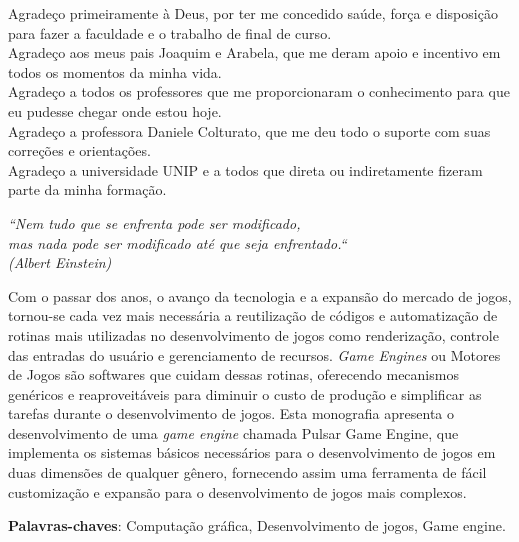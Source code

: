 \documentclass[12pt,	openright, twoside,	a4paper, english, french, spanish, brazil]{abntex2}
\begin{document}
\begin{agradecimentos}
Agradeço primeiramente à Deus, por ter me concedido saúde, força e disposição para fazer a faculdade e o trabalho de final de curso. \\

Agradeço aos meus pais Joaquim e Arabela, que me deram apoio e incentivo em todos os momentos da minha vida.\\

Agradeço a todos os professores que me proporcionaram o conhecimento para que eu pudesse chegar onde estou hoje. \\

Agradeço a professora Daniele Colturato, que me deu todo o suporte com suas correções e orientações. \\

Agradeço a universidade UNIP e a todos que direta ou indiretamente fizeram parte da minha formação.

\end{agradecimentos}

\begin{epigrafe}
    \vspace*{\fill}
	\begin{flushright}
		\textit{``Nem tudo que se enfrenta pode ser modificado, \\ 
		mas nada pode ser modificado até que seja enfrentado.``\\ 
		(Albert Einstein)}
	\end{flushright}
\end{epigrafe}


\setlength{\absparsep}{18pt} %
\begin{resumo}
Com o passar dos anos, o avanço da tecnologia e a expansão do mercado de jogos, tornou-se cada vez mais necessária a reutilização de códigos e automatização de rotinas mais utilizadas no desenvolvimento de jogos como renderização, controle das entradas do usuário e gerenciamento de recursos.
\textit{Game Engines} ou Motores de Jogos são softwares que cuidam dessas rotinas, oferecendo mecanismos genéricos e reaproveitáveis para diminuir o custo de produção e simplificar as tarefas durante o desenvolvimento de jogos. 
Esta monografia apresenta o desenvolvimento de uma \textit{game engine} chamada Pulsar Game Engine, que implementa os sistemas básicos necessários para o desenvolvimento de jogos em duas dimensões de qualquer gênero, fornecendo assim uma ferramenta de fácil customização e expansão para o desenvolvimento de jogos mais complexos. 

 \textbf{Palavras-chaves}: Computação gráfica, Desenvolvimento de jogos, Game engine.
\end{resumo}
\end{document}

